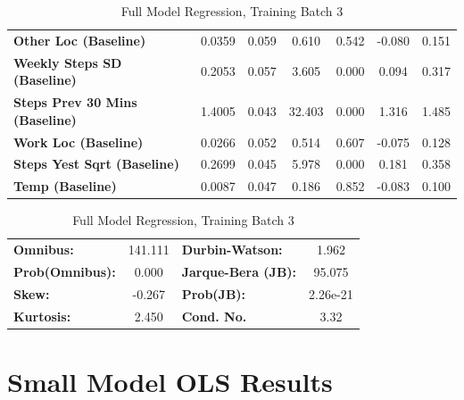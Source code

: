 \begin{table}
\begin{tabular}{lcccccc}
\textbf{Other Loc (Baseline)}          &       0.0359  &        0.059     &     0.610  &         0.542        &       -0.080    &        0.151     \\
\textbf{Weekly Steps SD (Baseline)}    &       0.2053  &        0.057     &     3.605  &         0.000        &        0.094    &        0.317     \\
\textbf{Steps Prev 30 Mins (Baseline)} &       1.4005  &        0.043     &    32.403  &         0.000        &        1.316    &        1.485     \\
\textbf{Work Loc (Baseline)}           &       0.0266  &        0.052     &     0.514  &         0.607        &       -0.075    &        0.128     \\
\textbf{Steps Yest Sqrt (Baseline)}    &       0.2699  &        0.045     &     5.978  &         0.000        &        0.181    &        0.358     \\
\textbf{Temp (Baseline)}               &       0.0087  &        0.047     &     0.186  &         0.852        &       -0.083    &        0.100     \\
\bottomrule
\end{tabular}
\begin{tabular}{lclc}
\textbf{Omnibus:}       & 141.111 & \textbf{  Durbin-Watson:     } &    1.962  \\
\textbf{Prob(Omnibus):} &   0.000 & \textbf{  Jarque-Bera (JB):  } &   95.075  \\
\textbf{Skew:}          &  -0.267 & \textbf{  Prob(JB):          } & 2.26e-21  \\
\textbf{Kurtosis:}      &   2.450 & \textbf{  Cond. No.          } &     3.32  \\
\bottomrule
\end{tabular}
\caption{Full Model Regression, Training Batch 3}
\end{table}

\medskip



\section{Small Model OLS Results}


